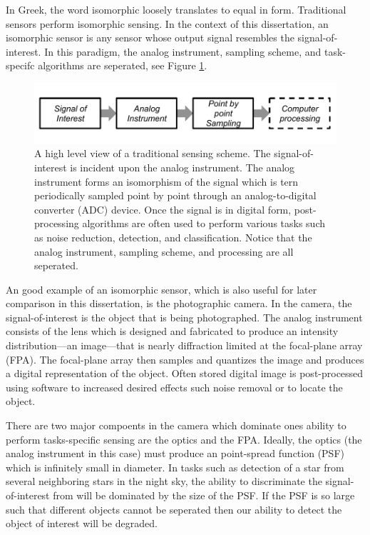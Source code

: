 In Greek, the word isomorphic loosely translates to equal in form. Traditional sensors perform isomorphic sensing. In the context of this dissertation, an isomorphic sensor is any sensor whose output signal resembles the signal-of-interest. In this paradigm, the analog instrument, sampling scheme, and task-specifc algorithms are seperated, see Figure \ref{fig:isomorphicsesingflowchart}.


\begin{figure}
    \centering
    \includegraphics[scale=1]{isomorphicsensorflowchart}
    \caption{A high level view of a traditional sensing scheme. The signal-of-interest is incident upon the analog instrument. The analog instrument forms an isomorphism of the signal which is tern periodically sampled point by point through an analog-to-digital converter (ADC) device. Once the signal is in digital form, post-processing algorithms are often used to perform various tasks such as noise reduction, detection, and classification. Notice that the analog instrument, sampling scheme, and processing are all seperated. }
    \label{fig:isomorphicsesingflowchart}
\end{figure}

An good example of an isomorphic sensor, which is also useful for later comparison in this dissertation, is the photographic camera. In the camera, the signal-of-interest is the object that is being photographed. The analog instrument consists of the lens which is designed and fabricated to produce an intensity distribution---an image---that is nearly diffraction limited at the focal-plane array (FPA). The focal-plane array then samples and quantizes the image and produces a digital representation of the object. Often stored digital image is post-processed using software to increased desired effects such noise removal or to locate the object. 

There are two major compoents in the camera which dominate ones ability to perform tasks-specific sensing are the optics and the FPA. Ideally, the optics (the analog instrument in this case) must produce an point-spread function (PSF) which is infinitely small in diameter. In tasks such as detection of a star from several neighboring stars in the night sky, the ability to discriminate the signal-of-interest from  will be dominated by the size of the PSF. If the PSF is so large such that different objects cannot be seperated then our ability to detect the object of interest will be degraded.

